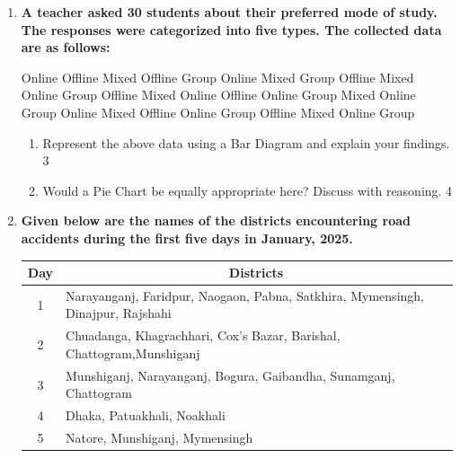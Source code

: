 \documentclass[a4paper,oneside]{book}
\begin{document}
    \begin{enumerate}
    
    \item
\textbf{A teacher asked 30 students about their preferred mode of study. The responses were categorized into five types. The collected data are as follows:}

\begin{centering}
Online  Offline  Mixed  Offline  Group  Online  Mixed  Group  Offline  Mixed \\
Online  Group    Offline Mixed   Online Offline Online  Group  Mixed   Online \\
Group   Online   Mixed  Offline  Online Group   Offline Mixed   Online Group \\
\end{centering}

\begin{enumerate}
  \item  
  Represent the above data using a Bar Diagram and explain your findings. \hfill 3
  \item
  Would a Pie Chart be equally appropriate here? Discuss with reasoning. \hfill 4
\end{enumerate}

 \item
  \textbf{Given below are the names of the districts encountering road accidents during the first five days in January, 2025.}

\begin{table}[h]
\centering
\begin{tabular}{|c|l|}
\hline
\multicolumn{1}{|c|}{Day} & \multicolumn{1}{c|}{Districts}                                                  \\ \hline
1                         & Narayanganj, Faridpur, Naogaon, Pabna, Satkhira, Mymensingh, Dinajpur, Rajshahi \\ \hline
2                         & Chuadanga, Khagrachhari, Cox's Bazar, Barishal, Chattogram,Munshiganj              \\ \hline
3                         & Munshiganj, Narayanganj, Bogura, Gaibandha, Sunamganj, Chattogram               \\ \hline
4                         & Dhaka, Patuakhali, Noakhali                                                     \\ \hline
5                         & Natore, Munshiganj, Mymensingh                                       \\ \hline
\end{tabular}
\end{table}


\end{enumerate}
\end{document}
